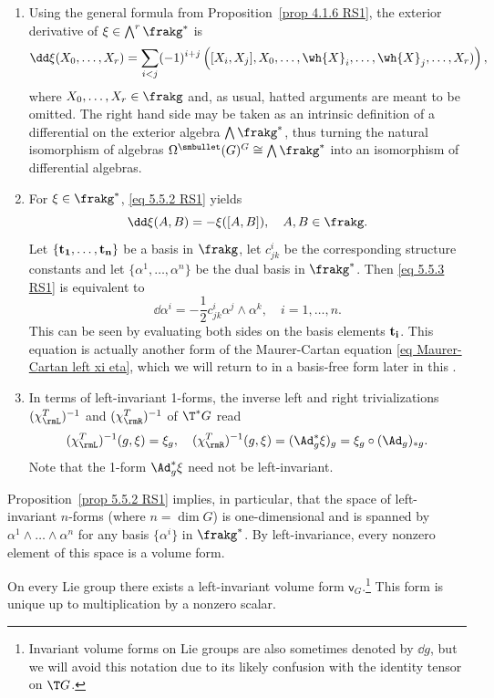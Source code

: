 \begin{rem}
\begin{enumerate}
    \item Using the general formula from Proposition~\ref{prop 4.1.6 RS1}, the exterior derivative of $\xi\in\bigwedge^r\frakg^\ast$ is
    \[\dd\xi(X_0,\ldots,X_r)=\sum_{i<j}(-1)^{i+j}\left([X_i,X_j],X_0,\ldots,\wh{X}_i,\ldots,\wh{X}_j,\ldots,X_r)\right),\label{eq 5.5.2 RS1}\]
    where $X_0,\ldots,X_r\in\frakg$ and, as usual, hatted arguments are meant to be omitted. The right hand side may be taken as an intrinsic definition of a differential on the exterior algebra $\bigwedge\frakg^\ast$, thus turning the natural isomorphism of algebras $\Omega^{\smbullet }(G)^G\cong\bigwedge\frakg^\ast$ into an isomorphism of differential algebras.
    \item For $\xi\in\frakg^\ast$, \eqref{eq 5.5.2 RS1} yields
    \[\dd\xi(A,B)=-\xi([A,B]),\quad A,B\in\frakg.\label{eq 5.5.3 RS1}\]
    Let $\{\bf{t}_1,\ldots,\bf{t}_n\}$ be a basis in $\frakg$, let $c^i_{jk}$  be the corresponding structure constants and let $\{\alpha^1,\ldots,\alpha^n\}$ be the dual basis in $\frakg^\ast$. Then \eqref{eq 5.5.3 RS1} is equivalent to
    \[\dd \alpha^i=-\frac 12 c^i_{jk}\alpha^j\wedge \alpha^k,\quad i=1,\ldots,n.\label{eq 5.5.4 RS1 MC in coords}\]
    This can be seen by evaluating both sides on the basis elements $\bf{t}_i$. This equation is actually another form of the Maurer-Cartan equation  \eqref{eq Maurer-Cartan left xi eta}, which we will return to in a basis-free form later in this \sect.
    \item In terms of left-invariant 1-forms, the inverse left and right trivializations $(\chi_\rmL^T)^{-1}$ and $(\chi_\rmR^T)^{-1}$ of $\T^\ast G$ read
    \[(\chi_\rmL^T)^{-1}(g,\xi)=\xi_g,\quad (\chi_\rmR^T)^{-1}(g,\xi)=(\Ad_{g}^\ast \xi)_g=\xi_g\circ (\Ad_g)_{\ast g}.\]
    Note that the 1-form $\Ad_g^\ast\xi$ need not be left-invariant.
\end{enumerate}
\end{rem}

Proposition~\ref{prop 5.5.2 RS1} implies, in particular, that the space of left-invariant $n$-forms (where $n=\dim G$) is one-dimensional and is spanned by $\alpha^1\wedge\ldots\wedge\alpha^n$ for any basis $\{\alpha^i\}$ in $\frakg^\ast$. By left-invariance, every nonzero element of this space is a volume form.

\begin{cor}
    On every Lie group there exists a left-invariant volume form $\mathsf{v}_G$.\footnote{Invariant volume forms on Lie groups are also sometimes denoted by $\dd g$, but we will avoid this notation due to its likely confusion with the identity tensor on $\T G$.} This form is unique up to multiplication by a nonzero scalar. 
\end{cor}

